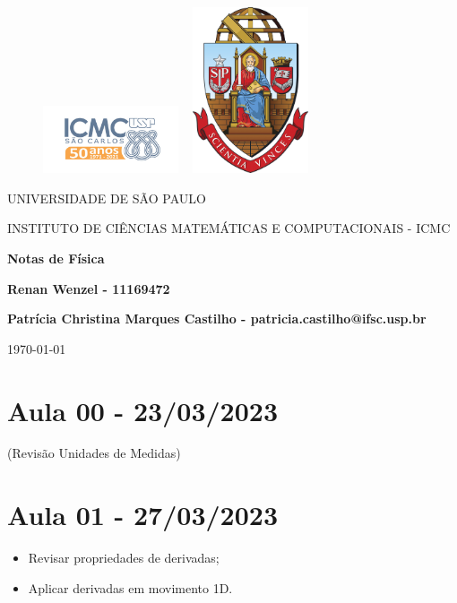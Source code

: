 \documentclass{article}
\begin{document}
\begin{figure}[ht]
  \includegraphics[width=4cm]{../icmc.png}
  \hspace{7cm}
  \includegraphics[height=4.9cm,width=4cm]{../brasao_usp_cor.jpg}
\endminipage  
\end{figure}

\begin{center}
\vspace{1cm}
\LARGE
UNIVERSIDADE DE S\~AO PAULO

\vspace{1.3cm}
\LARGE
INSTITUTO DE CI\^ENCIAS MATEM\'ATICAS E COMPUTACIONAIS - ICMC

\vspace{1.7cm}
\Large
\textbf{Notas de F\'isica}

\vspace{1.3cm}
\large
\textbf{Renan Wenzel - 11169472}

\vspace{1.3cm}
\large
\textbf{Patr\'icia Christina Marques Castilho - patricia.castilho@ifsc.usp.br}

\vspace{1.3cm}
\today
\end{center}

\newpage

\tableofcontents

\newpage

\section{Aula 00 - 23/03/2023}
  (Revis\~ao Unidades de Medidas)

\section{Aula 01 - 27/03/2023}
\begin{itemize}
  \item Revisar propriedades de derivadas;
  \item Aplicar derivadas em movimento 1D. 
\end{itemize}
\end{document}
